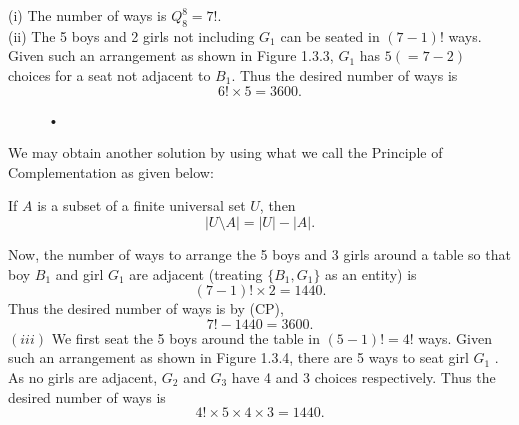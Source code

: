 \documentclass[a4paper,11pt]{book}
\begin{document}
\begin{soln}
(i) The number of ways is $Q_{8}^{8} = 7!.$ \\
(ii) The 5 boys and 2 girls not including $G_1$ can be seated in $(7 -1)!$ ways. Given such an arrangement as shown in Figure 1.3.3, $G_1$ has $5(= 7 - 2)$ choices for a seat not adjacent to $B_1$. Thus the desired number of ways is 
\[6! \times 5 = 3600.\] 
\begin{figure}[h]
\begin{center}
\caption{•}
\end{center}
\end{figure}

We may obtain another solution by using what we call the Principle of Complementation as given below: 
\begin{theorem}
If $A$ is a subset of a finite universal set $U$, then 
\[ |U\setminus A| = |U|-|A|.\]
\end{theorem}
Now, the number of ways to arrange the 5 boys and 3 girls around a table so that boy $B_1$ and girl $G_1$ are adjacent (treating $\{B_1 , G_1 \}$ as an 
entity) is 
\[(7 - 1)! \times 2 = 1440. \]
Thus the desired number of ways is by (CP), 
\[7! - 1440 = 3600.\] 
$(iii)$ We first seat the 5 boys around the table in $(5 - 1)! = 4!$ ways. 
Given such an arrangement as shown in Figure 1.3.4, there are 5 ways to 
seat girl  $G_1$ . As no girls are adjacent,  $G_2$ and  $G_3$ have 4 and 3 choices 
respectively. Thus the desired number of ways is 
\[4! \times 5 \times 4 \times 3 = 1440.\]
\end{soln}
\end{document}
